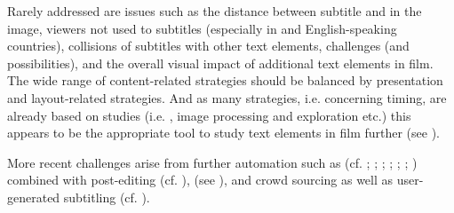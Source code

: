 Rarely addressed are issues such as the distance between subtitle and  in the image, viewers not used to subtitles (especially in  and English-speaking countries), collisions of subtitles with other text elements,  challenges (and possibilities), and the overall visual impact of additional text elements in film. The wide range of content-related strategies should be balanced by presentation and layout-related strategies. And as many strategies, i.e. concerning timing, are already based on  studies (i.e. , image processing and exploration etc.) this appears to be the appropriate tool to study text elements in film further (see ).

More recent challenges arise from further automation such as  (cf. \citealt{Armstrong2006}; \citealt{melero2006}; \citealt{Volk2008}; \citealt{Flanagan2009}; \citealt{Volk2010}; \citealt{Fishel2012}; \citealt{muller2013}) combined with post-editing (cf. \citealt{De_sousa2011}),  (see ), and crowd sourcing as well as user-generated subtitling (cf. \citealt{orrego_carmona2015}).

